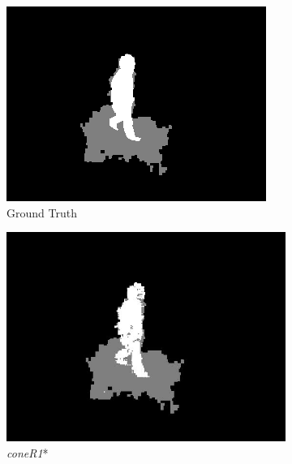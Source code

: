 \begin{figure}
  \begin{subfigure}{.24\linewidth}
  \includegraphics[width=1\linewidth]{figures/model/room_0275_gt.jpg}
  \caption{Ground Truth}
  \end{subfigure}
  \hfill
  \begin{subfigure}{.24\linewidth}
  \includegraphics[width=1\linewidth]{figures/model/room_0275_optimal.jpg}
  \caption{\textit{coneR1}*}
  \end{subfigure}
  \hfill
  \begin{subfigure}{.24\linewidth}

\end{subfigure}
\end{figure}
